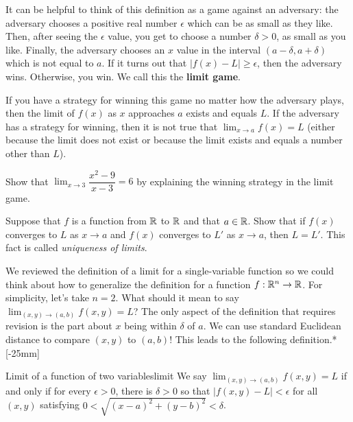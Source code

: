 \documentclass{watsonbook}
\begin{document}
It can be helpful to think of this definition as a game against an
adversary: the adversary chooses a positive real number $\epsilon$
which can be as small as they like. Then, after seeing the $\epsilon$
value, you get to choose a number $\delta>0$, as small as you
like. Finally, the adversary chooses an $x$ value in the interval
$(a-\delta, a + \delta)$ which is not equal to $a$. If it turns out
that $|f(x) - L| \geq \epsilon$, then the adversary wins. Otherwise,
you win. We call this the \textbf{limit game}.

If you have a strategy for winning this game no matter how the
adversary plays, then the limit of $f(x)$ as $x$ approaches $a$ exists
and equals $L$. If the adversary has a strategy for winning, then it
is not true that $\lim_{x \to a} f(x) = L$ (either because the limit
does not exist or because the limit exists and equals a number other
than $L$).

\begin{exercise}{}{}
  Show that $\displaystyle{\lim_{x \to 3}}\dfrac{x^2 - 9}{x - 3} = 6$
  by explaining the winning strategy in the limit game.
\end{exercise}

\begin{exercise}{}{}
  Suppose that $f$ is a function from $\mathbb{R}$ to $\mathbb{R}$ and that
  $a \in \mathbb{R}$. Show that if $f(x)$ converges to $L$ as $x\to a$ and
  $f(x)$ converges to $L'$ as $x\to a$, then $L = L'$. This fact is
  called \textit{uniqueness of limits}.
\end{exercise}

We reviewed the definition of a limit for a single-variable function
so we could think about how to generalize the definition for a
function $f:\mathbb{R}^n \to \mathbb{R}$. For simplicity, let's take $n = 2$. What
should it mean to say
$\displaystyle{\lim_{(x,y) \to (a,b)} f(x,y)} = L$? The only aspect of
the definition that requires revision is the part about $x$ being
within $\delta$ of $a$. We can use standard Euclidean distance to
compare $(x,y)$ to $(a,b)$! This leads to the following
definition.*[-25mm]

\begin{defn}{Limit of a function of two variables}{limit}
  We say $\lim_{(x,y)\to (a,b)} f(x,y) = L$ if and only if for every
  $\epsilon > 0$, there is $\delta>0$ so that
  $|f(x,y) - L| < \epsilon$ for all $(x,y)$ satisfying
  $0 < \sqrt{(x -a)^2 + (y-b)^2} < \delta$.
\end{defn}
\end{document}
